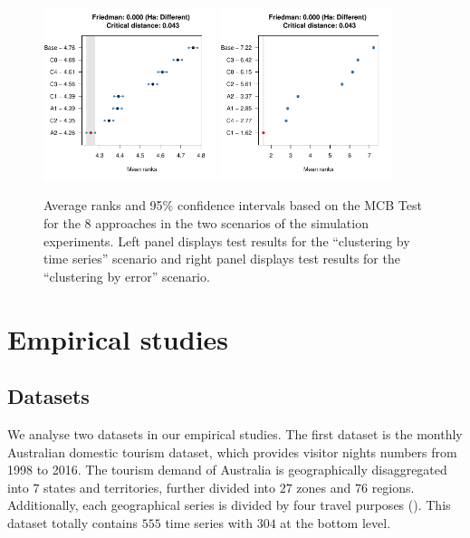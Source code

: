 \documentclass[a4paper,review,12pt,authoryear]{elsarticle}
\begin{document}
\begin{figure}
    \centering
    \includegraphics[width=0.45\textwidth]{figures/simu_mcb1.pdf}
    \includegraphics[width=0.45\textwidth]{figures/simu_mcb2.pdf}
    \caption{\label{fig:simu_mcb}Average ranks and 95\% confidence intervals based on the MCB Test for the $8$ approaches in the two scenarios of the simulation experiments. Left panel displays test results for the ``clustering by time series'' scenario and right panel displays test results for the ``clustering by error'' scenario.}
\end{figure}

\section{Empirical studies}

\subsection{Datasets}

We analyse two datasets in our empirical studies. The first dataset is the monthly Australian domestic tourism dataset, which provides visitor nights numbers from 1998 to 2016. The tourism demand of Australia is geographically disaggregated into $7$ states and territories, further divided into $27$ zones and $76$ regions. Additionally, each geographical series is divided by four travel purposes (\citealp{wickramasuriyaOptimalForecastReconciliation2019}). This dataset totally contains $555$ time series with $304$ at the bottom level.
\end{document}
